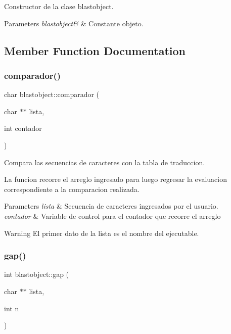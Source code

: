 Constructor de la clase blastobject. 


\begin{DoxyParams}{Parameters}
{\em blastobject\&} & Constante objeto. \\
\hline
\end{DoxyParams}


\subsection{Member Function Documentation}
\hypertarget{classblastobject_aeb5a23c8caddb226fa161fe3cb162c23}{}\label{classblastobject_aeb5a23c8caddb226fa161fe3cb162c23} 
\subsubsection{\texorpdfstring{comparador()}{comparador()}}
{\ttfamily char blastobject\+::comparador (\begin{DoxyParamCaption}\item[{char $\ast$$\ast$}]{lista,  }\item[{int}]{contador }\end{DoxyParamCaption})}



Compara las secuencias de caracteres con la tabla de traduccion. 

La funcion recorre el arreglo ingresado para luego regresar la evaluacion correspondiente a la comparacion realizada.


\begin{DoxyParams}{Parameters}
{\em lista} & Secuencia de caracteres ingresados por el usuario. \\
\hline
{\em contador} & Variable de control para el contador que recorre el arreglo \\
\hline
\end{DoxyParams}
\begin{DoxyWarning}{Warning}
El primer dato de la lista es el nombre del ejecutable. 
\end{DoxyWarning}
\hypertarget{classblastobject_ae6ca5436041b743e8c20739a9f59ef91}{}\label{classblastobject_ae6ca5436041b743e8c20739a9f59ef91} 
\subsubsection{\texorpdfstring{gap()}{gap()}}
{\ttfamily int blastobject\+::gap (\begin{DoxyParamCaption}\item[{char $\ast$$\ast$}]{lista,  }\item[{int}]{n }\end{DoxyParamCaption})}



